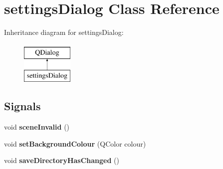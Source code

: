 \hypertarget{classsettings_dialog}{}\section{settings\+Dialog Class Reference}
\label{classsettings_dialog}
Inheritance diagram for settings\+Dialog\+:\begin{figure}[H]
\begin{center}
\leavevmode
\includegraphics[height=2.000000cm]{classsettings_dialog}
\end{center}
\end{figure}
\subsection*{Signals}
\begin{DoxyCompactItemize}
\item 
\mbox{\label{classsettings_dialog_afc5e121ba37f12221754a9e76172a82f}} 
void {\bfseries scene\+Invalid} ()
\item 
\mbox{\label{classsettings_dialog_a4b484584139b25437d8cb7218cf78a3c}} 
void {\bfseries set\+Background\+Colour} (Q\+Color colour)
\item 
\mbox{\label{classsettings_dialog_a2f3b6b8dc939f18ae86b54d8ef86da56}} 
void {\bfseries save\+Directory\+Has\+Changed} ()
\end{DoxyCompactItemize}
